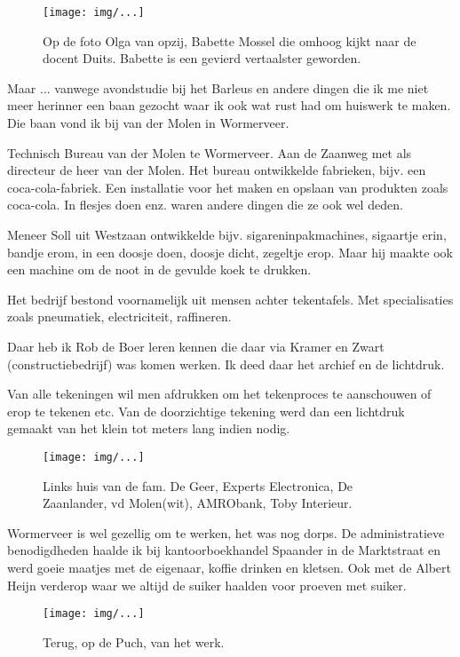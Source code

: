 \documentclass[10pt,twoside,openright]{memoir}
\begin{document}
\begin{figure}[t]
\texttt{[image: img/...]}
\caption{Op de foto Olga van opzij, Babette Mossel die omhoog kijkt naar de docent Duits. Babette is een gevierd vertaalster geworden.}
\end{figure}

Maar ... vanwege avondstudie bij het Barleus en andere dingen die ik me niet meer herinner een baan gezocht waar ik ook wat rust had om huiswerk te maken. Die baan vond ik bij van der Molen in Wormerveer.

Technisch Bureau van der Molen te Wormerveer. Aan de Zaanweg met als directeur de heer van der Molen. Het bureau ontwikkelde fabrieken, bijv. een coca-cola-fabriek. Een installatie voor het maken en opslaan van produkten zoals coca-cola. In flesjes doen enz. waren andere dingen die ze ook wel deden. 

Meneer Soll uit Westzaan ontwikkelde bijv. sigareninpakmachines, sigaartje erin, bandje erom, in een doosje doen, doosje dicht, zegeltje erop. Maar hij maakte ook een machine om de noot in de gevulde koek te drukken. 

Het bedrijf bestond voornamelijk uit mensen achter tekentafels. Met specialisaties zoals pneumatiek, electriciteit, raffineren.

Daar heb ik Rob de Boer leren kennen die daar via Kramer en Zwart (constructiebedrijf) was komen werken. Ik deed daar het archief en de lichtdruk. 

Van alle tekeningen wil men afdrukken om het tekenproces te aanschouwen of erop te tekenen etc. Van de doorzichtige tekening werd dan een lichtdruk gemaakt van het klein tot meters lang indien nodig. 

\begin{figure}[t]
\texttt{[image: img/...]}
\caption{Links huis van de fam. De Geer, Experts Electronica, De Zaanlander, vd Molen(wit), AMRObank, Toby Interieur.}
\end{figure}

Wormerveer is wel gezellig om te werken, het was nog dorps. De administratieve benodigdheden haalde ik bij kantoorboekhandel Spaander in de Marktstraat en werd goeie maatjes met de eigenaar, koffie drinken en kletsen. Ook met de Albert Heijn verderop waar we altijd de suiker haalden voor proeven met suiker. 

\begin{figure}[t]
\texttt{[image: img/...]}
\caption{Terug, op de Puch, van het werk.}
\end{figure}
\end{document}
